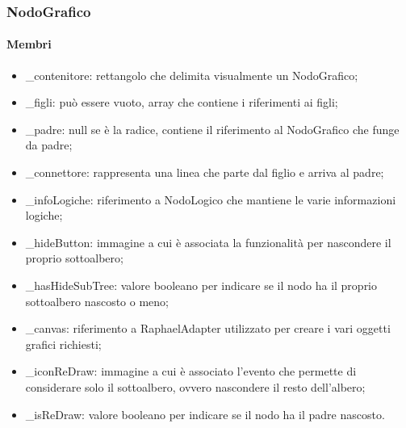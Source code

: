\subsubsection{NodoGrafico}
\paragraph{Membri}
\begin{itemize}
\item \_contenitore: rettangolo che delimita visualmente un NodoGrafico;
\item \_figli: può essere vuoto, array che contiene i riferimenti ai figli;
\item \_padre: null se è la radice, contiene il riferimento al NodoGrafico che funge da padre;
\item \_connettore: rappresenta una linea che parte dal figlio e arriva al padre;
\item \_infoLogiche: riferimento a NodoLogico che mantiene le varie informazioni logiche;
\item \_hideButton: immagine a cui è associata la funzionalità per nascondere il proprio sottoalbero;
\item \_hasHideSubTree: valore booleano per indicare se il nodo ha il proprio sottoalbero nascosto o meno;
\item \_canvas: riferimento a RaphaelAdapter utilizzato per creare i vari oggetti grafici richiesti;
\item \_iconReDraw: immagine a cui è associato l'evento che permette di considerare solo il sottoalbero, ovvero nascondere il resto dell'albero;
\item \_isReDraw: valore booleano per indicare se il nodo ha il padre nascosto.
\end{itemize}
